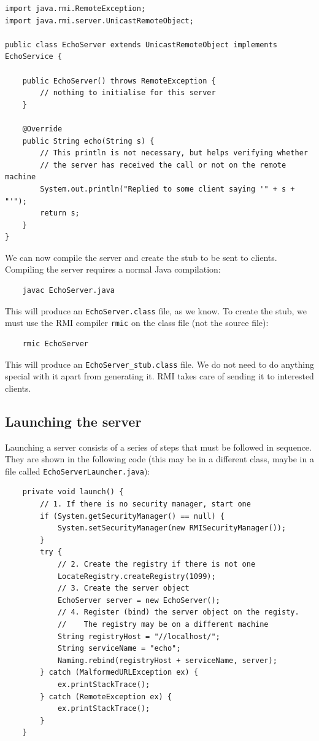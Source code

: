 \begin{verbatim}
import java.rmi.RemoteException;
import java.rmi.server.UnicastRemoteObject;

public class EchoServer extends UnicastRemoteObject implements EchoService {

    public EchoServer() throws RemoteException {
        // nothing to initialise for this server
    }

    @Override
    public String echo(String s) {
        // This println is not necessary, but helps verifying whether 
        // the server has received the call or not on the remote machine 
        System.out.println("Replied to some client saying '" + s + "'");
        return s;
    }
}
\end{verbatim}

We can now compile the server and create the stub to be sent to
clients. Compiling the server requires a normal Java compilation: 

\begin{verbatim}
    javac EchoServer.java
\end{verbatim}

This will produce an \verb+EchoServer.class+ file, as we know. To
create the stub, we must use the RMI compiler \verb+rmic+ 
on the class file (not the source file):

\begin{verbatim}
    rmic EchoServer
\end{verbatim}

This will produce an \verb+EchoServer_stub.class+ file. We do not need
to do anything special with it apart from generating it. RMI takes
care of sending it to interested clients. 

\subsection{Launching the server}
\label{sec:launching-server}

Launching a server consists of a series of steps that must be followed
in sequence. They are shown in the following code (this may be in a
different class, maybe in a file called \verb+EchoServerLauncher.java+): 

\begin{verbatim}
    private void launch() {
        // 1. If there is no security manager, start one
        if (System.getSecurityManager() == null) {
            System.setSecurityManager(new RMISecurityManager());
        }
        try {
            // 2. Create the registry if there is not one
            LocateRegistry.createRegistry(1099);
            // 3. Create the server object
            EchoServer server = new EchoServer();
            // 4. Register (bind) the server object on the registy. 
            //    The registry may be on a different machine
            String registryHost = "//localhost/";
            String serviceName = "echo";
            Naming.rebind(registryHost + serviceName, server);
        } catch (MalformedURLException ex) {
            ex.printStackTrace();
        } catch (RemoteException ex) {
            ex.printStackTrace();
        }
    }
\end{verbatim}


